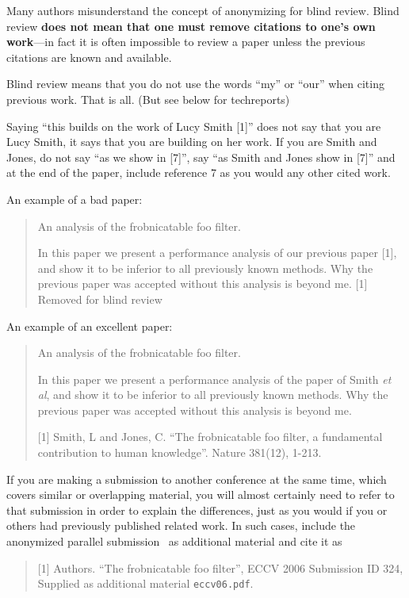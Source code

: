 \documentclass{bmvc2k}
\def\etal{\emph{et al}\bmvaOneDot}
\begin{document}
Many authors misunderstand the concept of anonymizing for blind
review.  Blind review {\bf does not mean that one must remove
citations to one's own work}---in fact it is often impossible to
review a paper unless the previous citations are known and
available.

Blind review means that you do not use the words ``my'' or ``our''
when citing previous work.  That is all.  (But see below for
techreports)

Saying ``this builds on the work of Lucy Smith [1]'' does not say
that you are Lucy Smith, it says that you are building on her
work.  If you are Smith and Jones, do not say ``as we show in
[7]'', say ``as Smith and Jones show in [7]'' and at the end of the
paper, include reference 7 as you would any other cited work.

An example of a bad paper:
\begin{quote}
\begin{center}
    An analysis of the frobnicatable foo filter.
\end{center}

   In this paper we present a performance analysis of our
   previous paper [1], and show it to be inferior to all
   previously known methods.  Why the previous paper was
   accepted without this analysis is beyond me.
   [1] Removed for blind review
\end{quote}


An example of an excellent paper:

\begin{quote}
\begin{center}
     An analysis of the frobnicatable foo filter.
\end{center}

   In this paper we present a performance analysis of the
   paper of Smith \etal [1], and show it to be inferior to
   all previously known methods.  Why the previous paper
   was accepted without this analysis is beyond me.

   [1] Smith, L and Jones, C. ``The frobnicatable foo
   filter, a fundamental contribution to human knowledge''.
   Nature 381(12), 1-213.
\end{quote}

If you are making a submission to another conference at the same time,
which covers similar or overlapping material, you will almost certainly
need to refer to that submission in order to explain the differences,
just as you would if you or others had previously published related
work.  In such cases, include the anonymized parallel
submission~\cite{Authors06} as additional material and cite it as
\begin{quote}
[1] Authors. ``The frobnicatable foo filter'', ECCV 2006 Submission ID 324,
Supplied as additional material {\tt eccv06.pdf}.
\end{quote}
\end{document}
